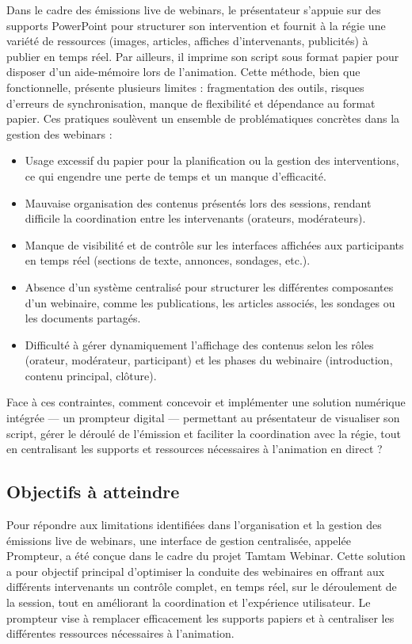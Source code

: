 Dans le cadre des émissions live de webinars, le présentateur s'appuie sur des supports
PowerPoint pour structurer son intervention et fournit à la régie une variété de ressources
(images, articles, affiches d'intervenants, publicités) à publier en temps réel. Par ailleurs,
il imprime son script sous format papier pour disposer d'un aide-mémoire lors de l'animation.
Cette méthode, bien que fonctionnelle, présente plusieurs limites : fragmentation des outils,
risques d'erreurs de synchronisation, manque de flexibilité et dépendance au format papier.
Ces pratiques soulèvent un ensemble de problématiques concrètes dans la gestion des webinars :

\begin{itemize}
    \item Usage excessif du papier pour la planification ou la gestion des interventions, ce qui
    engendre une perte de temps et un manque d'efficacité.
    \item Mauvaise organisation des contenus présentés lors des sessions, rendant difficile la
    coordination entre les intervenants (orateurs, modérateurs).
    \item Manque de visibilité et de contrôle sur les interfaces affichées aux participants en
    temps réel (sections de texte, annonces, sondages, etc.).
    \item Absence d'un système centralisé pour structurer les différentes composantes d'un
    webinaire, comme les publications, les articles associés, les sondages ou les documents
    partagés.
    \item Difficulté à gérer dynamiquement l'affichage des contenus selon les rôles (orateur,
    modérateur, participant) et les phases du webinaire (introduction, contenu principal, clôture).
\end{itemize}

Face à ces contraintes, comment concevoir et implémenter une solution numérique intégrée ---
un prompteur digital --- permettant au présentateur de visualiser son script, gérer le déroulé
de l'émission et faciliter la coordination avec la régie, tout en centralisant les supports et
ressources nécessaires à l'animation en direct ?

\subsection{Objectifs à atteindre}

Pour répondre aux limitations identifiées dans l'organisation et la gestion des émissions live
de webinars, une interface de gestion centralisée, appelée Prompteur, a été conçue dans le
cadre du projet Tamtam Webinar. Cette solution a pour objectif principal d'optimiser la conduite
des webinaires en offrant aux différents intervenants un contrôle complet, en temps réel, sur
le déroulement de la session, tout en améliorant la coordination et l'expérience utilisateur.
Le prompteur vise à remplacer efficacement les supports papiers et à centraliser les différentes
ressources nécessaires à l'animation.

